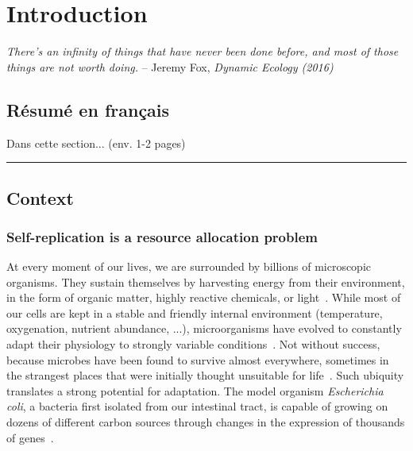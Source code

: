 \chapter{Introduction}

\textit{There's an infinity of things that have never been done before, and most of those things are not worth doing.} -- Jeremy Fox, \textit{Dynamic Ecology (2016)}~\cite{fox_how_2016}

\section*{Résumé en français}

Dans cette section... (env. 1-2 pages)

\begin{center}
\noindent\rule{4cm}{0.1pt}
\end{center}

\section{Context}
\label{sec:context}

\subsection{Self-replication is a resource allocation problem}

At every moment of our lives, we are surrounded by billions of microscopic organisms.
They sustain themselves by harvesting energy from their environment, in the form of organic matter, highly reactive chemicals, or light~\cite{madigan_biology_2006,schaechter_microbe_2006}.
While most of our cells are kept in a stable and friendly internal environment (temperature, oxygenation, nutrient abundance, ...), microorganisms have evolved to constantly adapt their physiology to strongly variable conditions~\cite{mcarthur_microbial_2006,menge_nitrogen_2012,hobbie_microbes_2013,
savageau_escherichia_1983,savageau_demand_1998,blount_unexhausted_2015,vanelsas_survival_2011}.
Not without success, because microbes have been found to survive almost everywhere, sometimes in the strangest places that were initially thought unsuitable for life~\cite{rothschild_life_2001,nicholson_transcriptomic_2012,madigan_biology_2006,schaechter_microbe_2006}.
Such ubiquity translates a strong potential for adaptation.
The model organism \textit{Escherichia coli}, a bacteria first isolated from our intestinal tract, is capable of growing on dozens of different carbon sources through changes in the expression of thousands of genes~\cite{zimmer_microcosm:_2009}.

